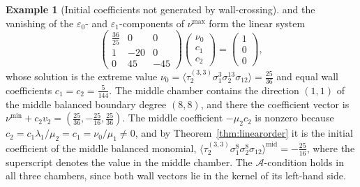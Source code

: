 \documentclass[11pt]{amsart}
\theoremstyle{definition}
\newtheorem{example}[theorem]{Example}
\theoremstyle{remark}
\newcommand{\Ascr}{\mathcal{A}}
\begin{document}
\begin{example}[Initial coefficients not generated by wall-crossing]
and the vanishing of the $\varepsilon_0$- and $\varepsilon_1$-components of
$\nu^{\max}$ form the linear system
\[
\begin{pmatrix}\tfrac{36}{25}&0&0\\[2pt] 1&-20&0\\ 0&45&-45\end{pmatrix}
\begin{pmatrix}\nu_0\\ c_1\\ c_2\end{pmatrix}
=\begin{pmatrix}1\\ 0\\ 0\end{pmatrix},
\]
whose solution is the extreme value
$\nu_0=\langle\tau_{2}^{(3,3)}\sigma_{1}^{3}\sigma_{2}^{13}\sigma_{12}\rangle
=\tfrac{25}{36}$ and equal wall coefficients $c_{1}=c_{2}=\tfrac5{144}$.  The
middle chamber contains the direction $(1,1)$ of the middle balanced boundary
degree $(8,8)$, and there the coefficient vector is
$\nu^{\min}+c_2v_2=(\tfrac{25}{36},-\tfrac{25}{16},\tfrac{25}{36})$.  The
middle coefficient $-\mu_2c_2$ is nonzero because $c_2=c_1\lambda_1/\mu_2=c_1
=\nu_0/\mu_1\ne0$, and by Theorem~\ref{thm:linearorder} it is the initial
coefficient of the middle balanced monomial,
$\langle\tau_{2}^{(3,3)}\sigma_{1}^{8}\sigma_{2}^{8}\sigma_{12}
\rangle^{\mathrm{mid}}=-\tfrac{25}{16}$, where the superscript denotes the
value in the middle chamber.  The $\Ascr$-condition holds in all
three chambers, since both wall vectors lie in the kernel of its left-hand
side.
\end{example}
\end{document}
